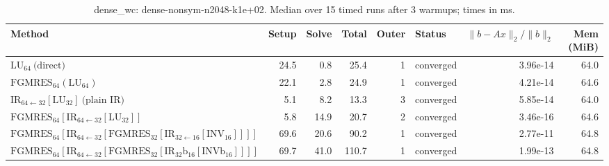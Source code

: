 \begin{table}[t]
\centering
\small
\caption{dense_wc: dense-nonsym-n2048-k1e+02. Median over 15 timed runs after 3 warmups; times in ms.}
\label{tab:dense_wc-dense-nonsym-n2048-k1e+02}
\begin{tabular}{lrrrrlrr}
\hline
Method & Setup & Solve & Total & Outer & Status & $\|b-Ax\|_2/\|b\|_2$ & Mem (MiB) \\
\hline
$\mathrm{LU}_{64}\ \text{(direct)}$ & 24.5 & 0.8 & 25.4 & 1 & converged & 3.96e-14 & 64.0 \\
$\mathrm{FGMRES}_{64}(\mathrm{LU}_{64})$ & 22.1 & 2.8 & 24.9 & 1 & converged & 4.21e-14 & 64.6 \\
$\mathrm{IR}_{64\leftarrow 32}[\mathrm{LU}_{32}]\ \text{(plain IR)}$ & 5.1 & 8.2 & 13.3 & 3 & converged & 5.85e-14 & 64.0 \\
$\mathrm{FGMRES}_{64}[\mathrm{IR}_{64\leftarrow 32}[\mathrm{LU}_{32}]]$ & 5.8 & 14.9 & 20.7 & 2 & converged & 3.46e-16 & 64.6 \\
$\mathrm{FGMRES}_{64}[\mathrm{IR}_{64\leftarrow 32}[\mathrm{FGMRES}_{32}[\mathrm{IR}_{32\leftarrow 16}[\mathrm{INV}_{16}]]]]$ & 69.6 & 20.6 & 90.2 & 1 & converged & 2.77e-11 & 64.8 \\
$\mathrm{FGMRES}_{64}[\mathrm{IR}_{64\leftarrow 32}[\mathrm{FGMRES}_{32}[\mathrm{IR}_{32}{\mathrm{b}_{16}}[\mathrm{INVb}_{16}]]]]$ & 69.7 & 41.0 & 110.7 & 1 & converged & 1.99e-13 & 64.8 \\
\hline
\end{tabular}
\end{table}

